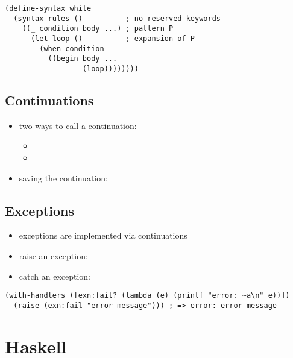 \documentclass[a4paper,landscape,10pt]{article}
\begin{document}
\begin{multicols*}{2}
  \begin{lstlisting}[language=Racket]
(define-syntax while
  (syntax-rules ()          ; no reserved keywords
    ((_ condition body ...) ; pattern P
      (let loop ()          ; expansion of P
        (when condition
          ((begin body ...
                  (loop))))))))
  \end{lstlisting}

  \subsection{Continuations}

  \begin{itemize}
    \item two ways to call a continuation:
          \begin{itemize}
            \item {}
            \item {}
          \end{itemize}
    \item saving the continuation: 
  \end{itemize}

  \subsection{Exceptions}

  \begin{itemize}
    \item exceptions are implemented via continuations
    \item raise an exception: 
    \item catch an exception: 
  \end{itemize}

  \begin{lstlisting}[language=Racket]
(with-handlers ([exn:fail? (lambda (e) (printf "error: ~a\n" e))])
  (raise (exn:fail "error message"))) ; => error: error message
  \end{lstlisting}

\end{multicols*}

\clearpage

\section{Haskell}
\end{document}

